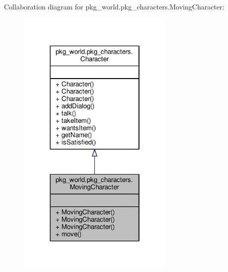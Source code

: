 Collaboration diagram for pkg\-\_\-world.\-pkg\-\_\-characters.\-Moving\-Character\-:
\nopagebreak
\begin{figure}[H]
\begin{center}
\leavevmode
\includegraphics[width=214pt]{classpkg__world_1_1pkg__characters_1_1MovingCharacter__coll__graph}
\end{center}
\end{figure}
